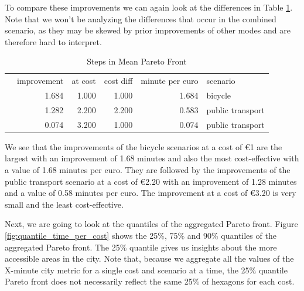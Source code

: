 To compare these improvements we can again look at the differences in Table \ref{tab:differences_in_mean_pareto_front}.
Note that we won't be analyzing the differences that occur in the combined scenario, as they may be skewed by prior improvements of other modes and are therefore hard to interpret.

\begin{table}
  \caption{Steps in Mean Pareto Front}
  \label{tab:differences_in_mean_pareto_front}
  \begin{center}
    \begin{tabular}{lrrrrl}
     & improvement & at cost & cost diff & minute per euro & scenario \\
     & 1.684 & 1.000 & 1.000 & 1.684 & bicycle \\
     & 1.282 & 2.200 & 2.200 & 0.583 & public transport \\
     & 0.074 & 3.200 & 1.000 & 0.074 & public transport \\
    \end{tabular}
  \end{center}
\end{table}

We see that the improvements of the bicycle scenarios at a cost of \euro{1} are the largest with an improvement of 1.68 minutes and also the most cost-effective with a value of 1.68 minutes per euro.
They are followed by the improvements of the public transport scenario at a cost of \euro{2.20} with an improvement of 1.28 minutes and a value of 0.58 minutes per euro.
The improvement at a cost of \euro{3.20} is very small and the least cost-effective.

Next, we are going to look at the quantiles of the aggregated Pareto front.
Figure \ref{fig:quantile_time_per_cost} shows the 25\%, 75\% and 90\% quantiles of the aggregated Pareto front.
The 25\% quantile gives us insights about the more accessible areas in the city.
Note that, because we aggregate all the values of the X-minute city metric for a single cost and scenario at a time, the 25\% quantile Pareto front does not necessarily reflect the same 25\% of hexagons for each cost.

